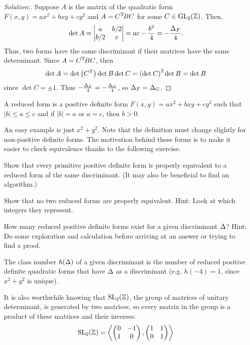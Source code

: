 \begin{proof}[Solution:] Suppose $A$ is the matrix of the quadratic form $F(x,y) = ax^2+bxy+cy^2$ and $A = C^{\mathrm{T}}\!BC$ for some $C\in\operatorname{GL}_{2}(\mathbb{Z})$. Then,
\[\det A = \begin{vmatrix}a&b/2\\b/2&c\end{vmatrix} = ac - \frac{b^2}{4} = -\frac{\Delta_F}{4}.\]
Thus, two forms have the same discriminant if their matrices have the same determinant. Since $A = C^{\mathrm{T}} \!BC$, then
\[\det A = \det\left(C^{\mathrm{T}}\right)\det B\det C = \left(\det C\right)^2\det B = \det B\]
since $\det C = \pm 1$. Thus $-\frac{\Delta_F}{4} = -\frac{\Delta_G}{4}$, so $\Delta_F = \Delta_G$.
\end{proof}
\begin{defn} A reduced form is a positive definite form $F(x,y) = ax^2+bxy+cy^2$ such that $|b|\le a\le c$ and if $|b|=a$ or $a = c$, then $b>0$.\end{defn}
An easy example is just $x^2+y^2$. Note that the definition must change slightly for non-positive definite forms. The motivation behind these forms is to make it easier to check equivalence thanks to the following exercise.
\begin{ex} Show that every primitive positive definite form is properly equivalent to a reduced form of the same discriminant. (It may also be beneficial to find an algorithm.)\end{ex}
\begin{ex} Show that no two reduced forms are properly equivalent. Hint: Look at which integers they represent.\end{ex} %
\begin{ex}How many reduced positive definite forms exist for a given discriminant $\Delta$? Hint: Do some exploration and calculation before arriving at an answer or trying to find a proof.
\label{formula}
\end{ex}
\begin{defn} The class number $h(\Delta)$ of a given discriminant is the number of reduced positive definite quadratic forms that have $\Delta$ as a discriminant (e.g. $h(-4) = 1$, since $x^2+y^2$ is unique).\end{defn}
It is also worthwhile knowing that $\operatorname{SL}_{2}(\mathbb{Z})$, the group of matrices of unitary determinant, is generated by two matrices, so every matrix in the group is a product of these matrices and their inverses:
\[\operatorname{SL}_{2}(\mathbb{Z}) = \left\langle \begin{pmatrix}0&-1\\1&0\end{pmatrix},
\begin{pmatrix}1&1\\0&1\end{pmatrix}\right\rangle\] 
%
